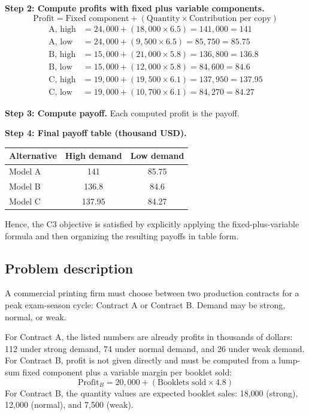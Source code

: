 \begin{ExamProblems}
		\textbf{Step 2: Compute profits with fixed plus variable components.}
		\[
		\text{Profit} = \text{Fixed component} + (\text{Quantity} \times \text{Contribution per copy})
		\]
		\[
		\begin{aligned}
		\text{A, high} &= 24{,}000 + (18{,}000 \times 6.5) = 141{,}000 = 141 \\
		\text{A, low} &= 24{,}000 + (9{,}500 \times 6.5) = 85{,}750 = 85.75 \\
		\text{B, high} &= 15{,}000 + (21{,}000 \times 5.8) = 136{,}800 = 136.8 \\
		\text{B, low} &= 15{,}000 + (12{,}000 \times 5.8) = 84{,}600 = 84.6 \\
		\text{C, high} &= 19{,}000 + (19{,}500 \times 6.1) = 137{,}950 = 137.95 \\
		\text{C, low} &= 19{,}000 + (10{,}700 \times 6.1) = 84{,}270 = 84.27
		\end{aligned}
		\]
		
		\textbf{Step 3: Compute payoff.} Each computed profit is the payoff.
		
		\textbf{Step 4: Final payoff table (thousand USD).}
		\begin{center}
			\begin{tabular}{l c c}
				\toprule
				Alternative & High demand & Low demand \\
				\midrule
				Model A & 141 & 85.75 \\
				Model B & 136.8 & 84.6 \\
				Model C & 137.95 & 84.27 \\
				\bottomrule
			\end{tabular}
		\end{center}
		
		Hence, the C3 objective is satisfied by explicitly applying the fixed-plus-variable formula and then organizing the resulting payoffs in table form.
		
		\item
		\subsection*{Problem description}
		A commercial printing firm must choose between two production contracts for a peak exam-season cycle: Contract A or Contract B.
		Demand may be strong, normal, or weak.
		
		For Contract A, the listed numbers are already profits in thousands of dollars: 112 under strong demand, 74 under normal demand, and 26 under weak demand.
		For Contract B, profit is not given directly and must be computed from a lump-sum fixed component plus a variable margin per booklet sold:
		\[
		\text{Profit}_B = 20{,}000 + (\text{Booklets sold} \times 4.8)
		\]
		For Contract B, the quantity values are expected booklet sales: 18{,}000 (strong), 12{,}000 (normal), and 7{,}500 (weak).
		

\end{ExamProblems}
